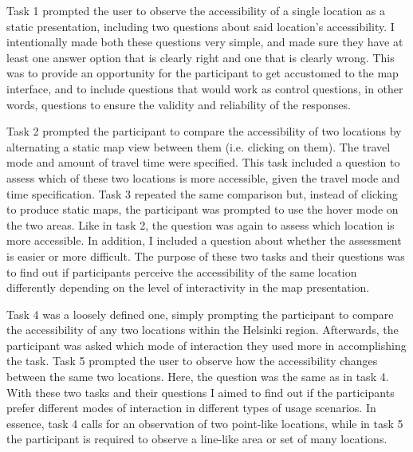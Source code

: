 Task 1 prompted the user to observe the accessibility of
a single location as a static presentation,
including two questions about said location's accessibility.
I intentionally made both these questions very simple,
and made sure they have at least one answer option that is clearly right
and one that is clearly wrong.
This was to provide an opportunity for the participant to get accustomed to the map interface,
and to include questions that would work as control questions,
in other words, questions to ensure the validity and reliability of the responses.

Task 2 prompted the participant to compare
the accessibility of two locations
by alternating a static map view between them (i.e. clicking on them).
The travel mode and amount of travel time were specified.
This task included a question to assess
which of these two locations is more accessible,
given the travel mode and time specification.
Task 3 repeated the same comparison but,
instead of clicking to produce static maps,
the participant was prompted to use the hover mode on the two areas.
Like in task 2,
the question was again to assess which location is more accessible.
In addition,
I included a question about whether the assessment is easier or more difficult.
The purpose of these two tasks and their questions was
to find out if participants perceive the accessibility of
the same location differently depending on
the level of interactivity in the map presentation.

Task 4 was a loosely defined one, simply prompting the participant to
compare the accessibility of any two locations within the Helsinki region.
Afterwards, the participant was asked
which mode of interaction they used more in accomplishing the task.
Task 5 prompted the user to observe how the accessibility changes
between the same two locations. Here, the question was the same as in task 4.
With these two tasks and their questions I aimed to find out
if the participants prefer different modes of interaction
in different types of usage scenarios.
In essence, task 4 calls for an observation of two point-like locations,
while in task 5 the participant is required to
observe a line-like area or set of many locations.

